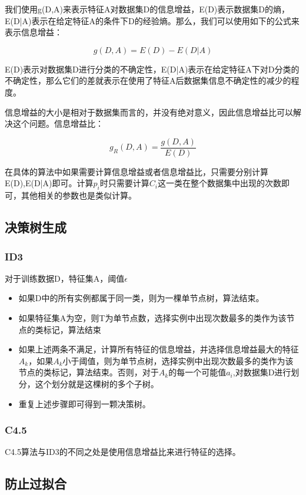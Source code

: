 	我们使用g(D,A)来表示特征A对数据集D的信息增益，E(D)表示数据集D的熵，E(D|A)表示在给定特征A的条件下D的经验熵。那么，我们可以使用如下的公式来表示信息增益：
	
	\begin{equation}
		g(D,A) = E(D) - E(D|A)
	\end{equation}
	
	E(D)表示对数据集D进行分类的不确定性，E(D|A)表示在给定特征A下对D分类的不确定性，那么它们的差就表示在使用了特征A后数据集信息不确定性的减少的程度。
	
	信息增益的大小是相对于数据集而言的，并没有绝对意义，因此信息增益比可以解决这个问题。信息增益比：
	
	\begin{equation}
		g_{R}(D,A) = \frac{g(D,A)}{E(D)}
	\end{equation}
	
	在具体的算法中如果需要计算信息增益或者信息增益比，只需要分别计算E(D),E(D|A)即可。计算$p_i$时只需要计算$C_i$这一类在整个数据集中出现的次数即可，其他相关的参数也是类似计算。
	
	\subsection{决策树生成}
	
	\subsubsection{ID3}
		对于训练数据D，特征集A，阈值$\epsilon$
		\begin{itemize}
			\item 如果D中的所有实例都属于同一类，则为一棵单节点树，算法结束。
			\item 如果特征集A为空，则T为单节点数，选择实例中出现次数最多的类作为该节点的类标记，算法结束
			\item 如果上述两条不满足，计算所有特征的信息增益，并选择信息增益最大的特征$A_k$，如果$A_k$小于阈值，则为单节点树，选择实例中出现次数最多的类作为该节点的类标记，算法结束。否则，对于$A_k$的每一个可能值$a_i$,对数据集D进行划分，这个划分就是这棵树的多个子树。
			\item 重复上述步骤即可得到一颗决策树。
		\end{itemize}
	\subsubsection{C4.5}
	C4.5算法与ID3的不同之处是使用信息增益比来进行特征的选择。
	
	\subsection{防止过拟合}
	
